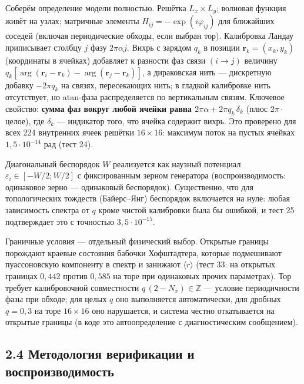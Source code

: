 \documentclass[
]{article}
\begin{document}
Соберём определение модели полностью. Решётка \(L_x\times L_y\);
волновая функция живёт на узлах; матричные элементы
\(H_{ij} = -\exp(i\varphi_{ij})\) для ближайших соседей (включая
периодические обходы, если выбран тор). Калибровка Ландау приписывает
столбцу \(j\) фазу \(2\pi\alpha j\). Вихрь с зарядом \(q_k\) в позиции
\(\mathbf r_k=(x_k,y_k)\) (координаты в ячейках) добавляет к разности
фаз связи \((i\to j)\) величину
\(q_k[\arg(\mathbf r_i-\mathbf r_k)-\arg(\mathbf r_j-\mathbf r_k)]\), а
дираковская нить --- дискретную добавку \(-2\pi q_k\) на связях,
пересекающих нить; в гладкой калибровке нить отсутствует, но atan-фаза
распределяется по вертикальным связям. Ключевое свойство: \textbf{сумма
фаз вокруг любой ячейки равна \(2\pi\alpha + 2\pi q_k\,\delta_k\)} (плюс
\(2\pi\cdot\)целое), где \(\delta_k\) --- индикатор того, что ячейка
содержит вихрь. Это проверено для всех 224 внутренних ячеек решётки
\(16\times16\): максимум \textbar поток\textbar{} на пустых ячейках
\(1{,}5\cdot10^{-14}\) рад (тест 24).

Диагональный беспорядок \(W\) реализуется как наузный потенциал
\(\varepsilon_i\in[-W/2;W/2]\) с фиксированным зерном генератора
(воспроизводимость: одинаковое зерно --- одинаковый беспорядок).
Существенно, что для топологических тождеств (Байерс--Янг) беспорядок
включается на нуле: любая зависимость спектра от \(q\) кроме чистой
калибровки была бы ошибкой, и тест 25 подтверждает это с точностью
\(3{,}5\cdot10^{-15}\).

Граничные условия --- отдельный физический выбор. Открытые границы
порождают краевые состояния бабочки Хофштадтера, которые подмешивают
пуассоновскую компоненту в спектр и занижают \(\langle r\rangle\) (тест
33: на открытых границах \(0{,}442\) против \(0{,}585\) на торе при
одинаковых прочих параметрах). Тор требует калибровочной совместности
\(q\,(2-N_x)\in\mathbb{Z}\) --- условие периодичности фазы при обходе;
для целых \(q\) оно выполняется автоматически, для дробных \(q=0{,}3\)
на торе \(16\times16\) оно нарушается, и система честно откатывается на
открытые границы (в коде это автоопределение с диагностическим
сообщением).

\subsection{2.4 Методология верификации и
воспроизводимость}\label{ux43cux435ux442ux43eux434ux43eux43bux43eux433ux438ux44f-ux432ux435ux440ux438ux444ux438ux43aux430ux446ux438ux438-ux438-ux432ux43eux441ux43fux440ux43eux438ux437ux432ux43eux434ux438ux43cux43eux441ux442ux44c}
\end{document}
